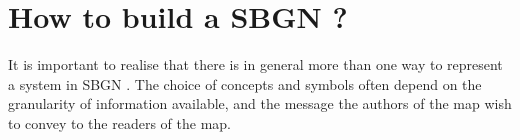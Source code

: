 \chapter{How to build a SBGN \PDm?}

It is important to realise that there is in general more than one way to represent a system in SBGN \PD. The choice of concepts and symbols often depend on the granularity of information available, and the message the authors of the map wish to convey to the readers of the map. 





